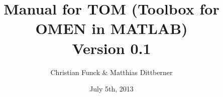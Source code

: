 


\title{Manual for TOM (Toolbox for OMEN in MATLAB) \\ {\small Version 0.1}}
\author{Christian Funck \& Matthias Dittberner}
\date{July 5th, 2013}


	\maketitle
	\tableofcontents
	
	
	
	\printglossaries \label{glossary}

	\clearpage
	\printindex



